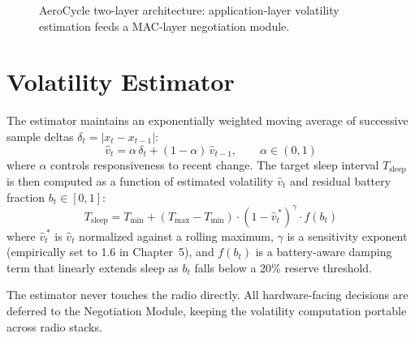 \documentclass[12pt,a4paper]{report}
\begin{document}
\begin{figure}[H]
\centering
{}
\caption{AeroCycle two-layer architecture: application-layer volatility estimation feeds a MAC-layer negotiation module.}
\label{fig:arch}
\end{figure}

\section{Volatility Estimator}
The estimator maintains an exponentially weighted moving average of successive sample
deltas $\delta_t = |x_t - x_{t-1}|$:
\begin{equation}
\hat{v}_t = \alpha \, \delta_t + (1-\alpha)\, \hat{v}_{t-1}, \qquad \alpha \in (0,1)
\label{eq:ewma}
\end{equation}
where $\alpha$ controls responsiveness to recent change. The target sleep interval
$T_{\text{sleep}}$ is then computed as a function of estimated volatility $\hat{v}_t$ and
residual battery fraction $b_t \in [0,1]$:
\begin{equation}
T_{\text{sleep}} = T_{\min} + (T_{\max} - T_{\min}) \cdot \left(1 - \hat{v}_t^{\,*}\right)^{\gamma} \cdot f(b_t)
\label{eq:sleep}
\end{equation}
where $\hat{v}_t^{\,*}$ is $\hat{v}_t$ normalized against a rolling maximum, $\gamma$ is a
sensitivity exponent (empirically set to 1.6 in Chapter~5), and $f(b_t)$ is a battery-aware
damping term that linearly extends sleep as $b_t$ falls below a 20\% reserve threshold.

\begin{infobox}[title={\faLock\ Design Invariant}]
The estimator never touches the radio directly. All hardware-facing decisions are deferred to
the Negotiation Module, keeping the volatility computation portable across radio stacks.
\end{infobox}
\end{document}
